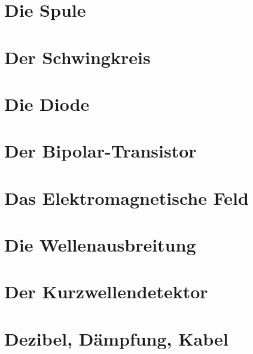 \documentclass[ngerman,openany,oneside]{Script}
\begin{document}


\newpage
\chapter{Die Spule}


\chapter{Der Schwingkreis}


\chapter{Die Diode}


\chapter{Der Bipolar-Transistor}


\chapter{Das Elektromagnetische Feld}


\chapter{Die Wellenausbreitung}


\chapter{Der Kurzwellendetektor}


\chapter{Dezibel, Dämpfung, Kabel}



\end{document}
